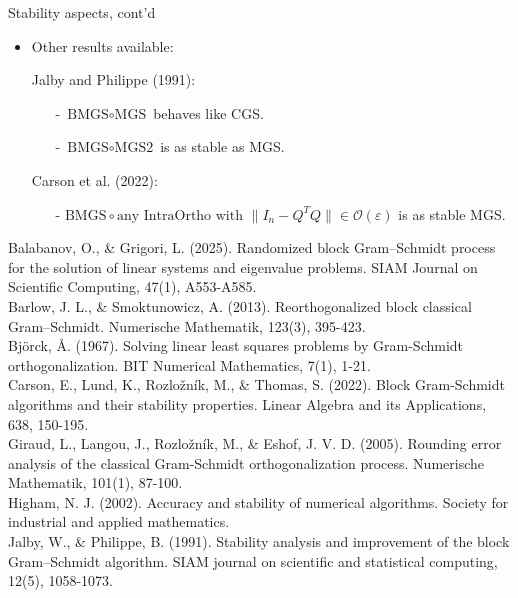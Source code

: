 \documentclass[t,usepdftitle=false]{beamer}
\begin{document}
\begin{frame}{Stability aspects, cont'd}
\begin{itemize}
\item Other results available:
\item[] Jalby and Philippe (1991):
\begin{itemize}\normalsize
\item[-] $\text{BMGS}\circ\text{MGS}$ behaves like CGS.\vspace{.1cm}
\item[-] $\text{BMGS}\circ\text{MGS2}$ is as stable as MGS.
\end{itemize}
\item[] Carson et al. (2022):
\begin{itemize}
\item[-] $\text{BMGS}\circ\text{any IntraOrtho with }\|I_n-Q^TQ\|\in\mathcal{O}(\varepsilon)$ is as stable MGS.
\end{itemize}
\end{itemize}
\smallskip
\tiny{Balabanov, O., \& Grigori, L. (2025). Randomized block Gram–Schmidt process for the solution of linear systems and eigenvalue problems. SIAM Journal on Scientific Computing, 47(1), A553-A585.}\tinyskip\\
\tiny{Barlow, J. L., \& Smoktunowicz, A. (2013). Reorthogonalized block classical Gram–Schmidt. Numerische Mathematik, 123(3), 395-423.}\tinyskip\\
\tiny{Björck, Å. (1967). Solving linear least squares problems by Gram-Schmidt orthogonalization. BIT Numerical Mathematics, 7(1), 1-21.}\tinyskip\\
\tiny{Carson, E., Lund, K., Rozložník, M., \& Thomas, S. (2022). Block Gram-Schmidt algorithms and their stability properties. Linear Algebra and its Applications, 638, 150-195.}\tinyskip\\
\tiny{Giraud, L., Langou, J., Rozložník, M., \& Eshof, J. V. D. (2005). Rounding error analysis of the classical Gram-Schmidt orthogonalization process. Numerische Mathematik, 101(1), 87-100.}\tinyskip\\
\tiny{Higham, N. J. (2002). Accuracy and stability of numerical algorithms. Society for industrial and applied mathematics.}\tinyskip\\
\tiny{Jalby, W., \& Philippe, B. (1991). Stability analysis and improvement of the block Gram–Schmidt algorithm. SIAM journal on scientific and statistical computing, 12(5), 1058-1073.}\tinyskip\\

\end{frame}
\end{document}
